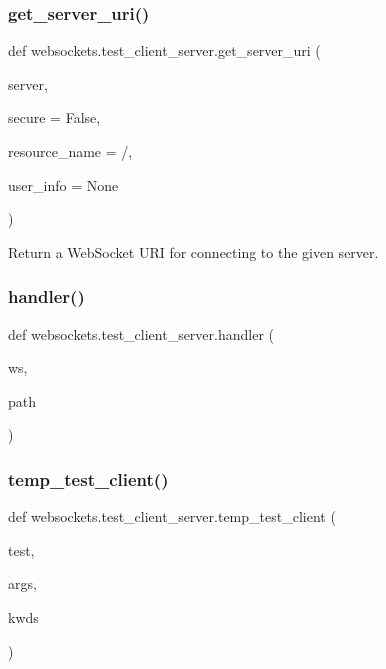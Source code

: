 \subsubsection{\texorpdfstring{get\+\_\+server\+\_\+uri()}{get\_server\_uri()}}
{\footnotesize\ttfamily def websockets.\+test\+\_\+client\+\_\+server.\+get\+\_\+server\+\_\+uri (\begin{DoxyParamCaption}\item[{}]{server,  }\item[{}]{secure = {\ttfamily False},  }\item[{}]{resource\+\_\+name = {\ttfamily \textquotesingle{}/\textquotesingle{}},  }\item[{}]{user\+\_\+info = {\ttfamily None} }\end{DoxyParamCaption})}

\begin{DoxyVerb}Return a WebSocket URI for connecting to the given server.\end{DoxyVerb}
 \mbox{\label{namespacewebsockets_1_1test__client__server_a13e42f6375e27f142918637259b708cd}} 
\subsubsection{\texorpdfstring{handler()}{handler()}}
{\footnotesize\ttfamily def websockets.\+test\+\_\+client\+\_\+server.\+handler (\begin{DoxyParamCaption}\item[{}]{ws,  }\item[{}]{path }\end{DoxyParamCaption})}

\mbox{\label{namespacewebsockets_1_1test__client__server_a2cbfa658e242b0488352f0e812f8b53f}} 
\subsubsection{\texorpdfstring{temp\+\_\+test\+\_\+client()}{temp\_test\_client()}}
{\footnotesize\ttfamily def websockets.\+test\+\_\+client\+\_\+server.\+temp\+\_\+test\+\_\+client (\begin{DoxyParamCaption}\item[{}]{test,  }\item[{}]{args,  }\item[{}]{kwds }\end{DoxyParamCaption})}

